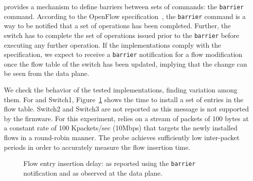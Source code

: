 \of provides a mechanism to define barriers between sets of
commands: the \texttt{barrier} command. According to the OpenFlow
specification~\cite{openflow-spec}, the \texttt{barrier} command is a way to be
notified that a set of \of operations has been completed. Further, 
the switch has to complete the set of operations issued prior to the
\texttt{barrier}
before executing any further operation. If the \of implementations 
comply with the specification, we expect to receive a \texttt{barrier} notification for 
a flow modification once the flow table of the switch has been updated, 
implying that the change can be seen from the data plane.

We check the behavior of the tested \of implementations,
finding variation among them. For \ovs and Switch1,
Figure~\ref{fig:flow_insertion_comparison} shows the time to install a
set of entries in the flow table. Switch2 and Switch3 
are not reported as this \of message is not supported by the firmware. 
For this experiment, \oflops relies on a stream of packets of 100 bytes at
a constant rate of 100 Kpackets/sec (10Mbps) that targets the newly installed flows in a
round-robin manner. The probe achieves sufficiently low inter-packet
periods in order to accurately measure the flow insertion time.


\begin{figure}[ht]
  \begin{center}
  \end{center}
  \caption{Flow entry insertion delay: as reported using the
    \texttt{barrier} notification and as observed at the data
    plane.}
  \label{fig:flow_insertion_comparison}
\end{figure}


